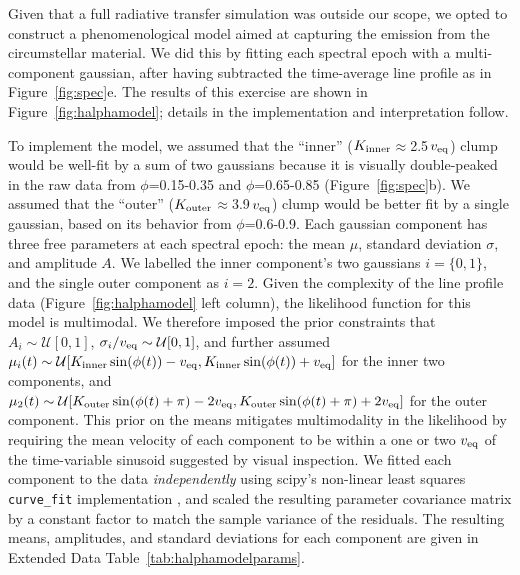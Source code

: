 \documentclass{nature3}
\begin{document}
\begin{methods}
Given that a full radiative transfer simulation was outside our scope,
we opted to construct a phenomenological model aimed at capturing 
the emission from the circumstellar material.  We did this by
fitting each spectral epoch with a multi-component
gaussian, after having subtracted the time-average line profile as in
Figure~\ref{fig:spec}e.  The results of this exercise are shown in
Figure~\ref{fig:halphamodel}; details in the implementation and
interpretation follow.

To implement the model, we assumed that the ``inner'' ($K_{\rm
inner}$$\approx$2.5\,$v_{\rm eq}$) clump would be well-fit by a sum of
two gaussians because it is visually double-peaked in the raw
data from $\phi$=0.15-0.35 and $\phi$=0.65-0.85
(Figure~\ref{fig:spec}b).  We assumed that the ``outer'' ($K_{\rm
outer}$$\approx$3.9\,$v_{\rm eq}$) clump would be better fit by a
single gaussian, based on its behavior from $\phi$=0.6-0.9.  Each
gaussian component has three free parameters at each spectral epoch:
the mean $\mu$, standard deviation $\sigma$, and amplitude $A$.
We labelled the inner component's two gaussians $i=\{ 0, 1 \}$,
and the single outer component as $i=2$.  Given the complexity of the
line profile data (Figure~\ref{fig:halphamodel} left column), the
likelihood function for this model is multimodal.  We therefore
imposed the prior constraints that $A_i \sim \mathcal{U}[0,1]$,
$\sigma_i/v_{\rm eq} \sim \mathcal{U}[0,1]$, and further assumed
$\mu_i(t) \sim
\mathcal{U}[
  K_{\rm inner}\sin(\phi(t)) - v_{\rm eq},
  K_{\rm inner}\sin(\phi(t)) + v_{\rm eq}
]$
for the inner two components, and
$\mu_2(t) \sim
\mathcal{U}[
  K_{\rm outer}\sin(\phi(t) + \pi) - 2v_{\rm eq},
  K_{\rm outer}\sin(\phi(t) + \pi) + 2v_{\rm eq}
]$
for the outer component.  This prior on the means mitigates 
multimodality in the likelihood by requiring the mean velocity of each
component to be within a one or two $v_{\rm eq}$ of the time-variable
sinusoid suggested by visual inspection.  We fitted each component to
the data {\it independently} using scipy's non-linear least squares
\texttt{curve\_fit} implementation \cite{Virtanen2020}, and scaled the
resulting parameter covariance matrix by a constant factor to match
the sample variance of the residuals.  The resulting means,
amplitudes, and standard deviations for each component are given in
Extended Data Table~\ref{tab:halphamodelparams}.


\end{methods}
\end{document}
